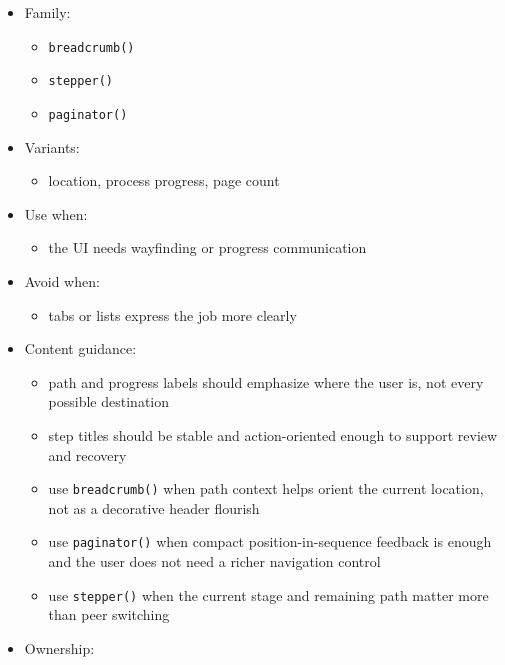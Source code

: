 \begin{itemize}
\tightlist
\item
  Family:

  \begin{itemize}
  \tightlist
  \item
    \texttt{b\allowbreak{}r\allowbreak{}e\allowbreak{}a\allowbreak{}d\allowbreak{}c\allowbreak{}r\allowbreak{}u\allowbreak{}m\allowbreak{}b\allowbreak{}(\allowbreak{})}
  \item
    \texttt{s\allowbreak{}t\allowbreak{}e\allowbreak{}p\allowbreak{}p\allowbreak{}e\allowbreak{}r\allowbreak{}(\allowbreak{})}
  \item
    \texttt{p\allowbreak{}a\allowbreak{}g\allowbreak{}i\allowbreak{}n\allowbreak{}a\allowbreak{}t\allowbreak{}o\allowbreak{}r\allowbreak{}(\allowbreak{})}
  \end{itemize}
\item
  Variants:

  \begin{itemize}
  \tightlist
  \item
    location, process progress, page count
  \end{itemize}
\item
  Use when:

  \begin{itemize}
  \tightlist
  \item
    the UI needs wayfinding or progress communication
  \end{itemize}
\item
  Avoid when:

  \begin{itemize}
  \tightlist
  \item
    tabs or lists express the job more clearly
  \end{itemize}
\item
  Content guidance:

  \begin{itemize}
  \tightlist
  \item
    path and progress labels should emphasize where the user is, not every possible destination
  \item
    step titles should be stable and action-oriented enough to support review and recovery
  \item
    use \texttt{b\allowbreak{}r\allowbreak{}e\allowbreak{}a\allowbreak{}d\allowbreak{}c\allowbreak{}r\allowbreak{}u\allowbreak{}m\allowbreak{}b\allowbreak{}(\allowbreak{})} when path context helps orient the current location, not as a decorative header flourish
  \item
    use \texttt{p\allowbreak{}a\allowbreak{}g\allowbreak{}i\allowbreak{}n\allowbreak{}a\allowbreak{}t\allowbreak{}o\allowbreak{}r\allowbreak{}(\allowbreak{})} when compact position-in-sequence feedback is enough and the user does not need a richer navigation control
  \item
    use \texttt{s\allowbreak{}t\allowbreak{}e\allowbreak{}p\allowbreak{}p\allowbreak{}e\allowbreak{}r\allowbreak{}(\allowbreak{})} when the current stage and remaining path matter more than peer switching
  \end{itemize}
\item
  Ownership:


\end{itemize}
